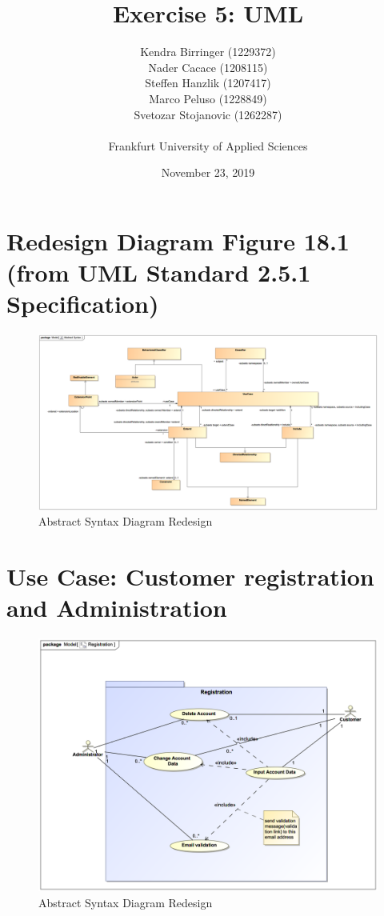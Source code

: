 \documentclass[a4paper, 12pt]{article}
\title{Exercise 5: UML}
\author{
    Kendra Birringer (1229372)\\
    Nader Cacace (1208115)\\
    Steffen Hanzlik (1207417)\\
    Marco Peluso (1228849)\\
    Svetozar Stojanovic (1262287)\\
    \\
    Frankfurt University of Applied Sciences
}
\date{November 23, 2019}
\begin{document}
\maketitle
\newpage
\tableofcontents
\listoffigures

\newpage
\section{Redesign Diagram Figure 18.1 (from UML Standard 2.5.1 Specification\cite{uml251specpdf})}
\begin{figure}[H]
\begin{center}
\includegraphics[scale=0.4, angle=90, origin=c]{01-abstract-syntax.png}
\end{center}
\caption{Abstract Syntax Diagram Redesign}
\end{figure}

\section{Use Case: Customer registration and Administration}
\begin{figure}[H]
\begin{center}
\includegraphics[scale=0.5]{02-e-bike-rental-service-variant-1-01.png}
\end{center}
\caption{Abstract Syntax Diagram Redesign}
\end{figure}
\end{document}
